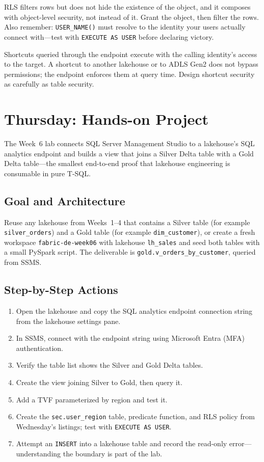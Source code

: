 \begin{pitfall}
RLS filters rows but does not hide the existence of the object, and it composes with object-level security, not instead of it. Grant the object, then filter the rows. Also remember: \texttt{USER\_NAME()} must resolve to the identity your users actually connect with---test with \texttt{EXECUTE AS USER} before declaring victory.
\end{pitfall}

\begin{notebox}
Shortcuts queried through the endpoint execute with the calling identity's access to the target. A shortcut to another lakehouse or to ADLS Gen2 does not bypass permissions; the endpoint enforces them at query time. Design shortcut security as carefully as table security.
\end{notebox}

\section{Thursday: Hands-on Project}
The Week~6 lab connects SQL Server Management Studio to a lakehouse's SQL analytics endpoint and builds a view that joins a Silver Delta table with a Gold Delta table---the smallest end-to-end proof that lakehouse engineering is consumable in pure T-SQL.

\subsection{Goal and Architecture}
Reuse any lakehouse from Weeks~1--4 that contains a Silver table (for example \texttt{silver\_orders}) and a Gold table (for example \texttt{dim\_customer}), or create a fresh workspace \texttt{fabric-de-week06} with lakehouse \texttt{lh\_sales} and seed both tables with a small PySpark script. The deliverable is \texttt{gold.v\_orders\_by\_customer}, queried from SSMS.

\subsection{Step-by-Step Actions}
\begin{enumerate}
    \item Open the lakehouse and copy the SQL analytics endpoint connection string from the lakehouse settings pane.
    \item In SSMS, connect with the endpoint string using Microsoft Entra (MFA) authentication.
    \item Verify the table list shows the Silver and Gold Delta tables.
    \item Create the view joining Silver to Gold, then query it.
    \item Add a TVF parameterized by region and test it.
    \item Create the \texttt{sec.user\_region} table, predicate function, and RLS policy from Wednesday's listings; test with \texttt{EXECUTE AS USER}.
    \item Attempt an \texttt{INSERT} into a lakehouse table and record the read-only error---understanding the boundary is part of the lab.
\end{enumerate}

